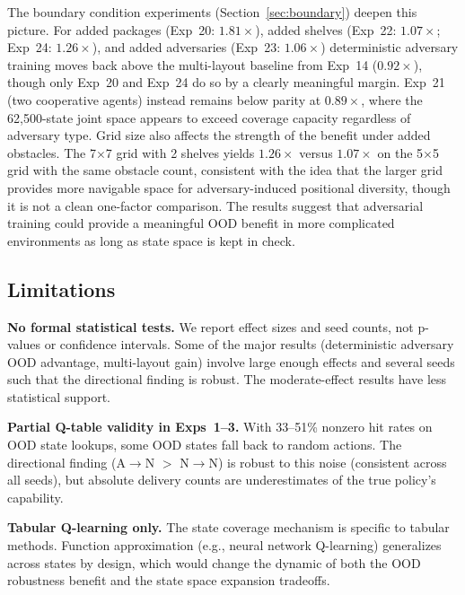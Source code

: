 \documentclass[sigconf]{aamas}
\begin{document}
The boundary condition experiments (Section~\ref{sec:boundary}) deepen this picture.
For added packages (Exp~20: $1.81\times$), added
shelves (Exp~22: $1.07\times$; Exp~24: $1.26\times$), and added adversaries (Exp~23:
$1.06\times$) deterministic adversary training moves back above the multi-layout
baseline from Exp~14 ($0.92\times$), though only Exp~20 and Exp~24 do so by a
clearly meaningful margin. Exp~21 (two cooperative agents) instead remains below
parity at $0.89\times$, where the 62{,}500-state joint space appears to exceed
coverage capacity regardless of adversary type. Grid size also affects the strength of
the benefit under added obstacles. The 7$\times$7 grid with 2 shelves yields
$1.26\times$ versus $1.07\times$ on the 5$\times$5 grid with the same obstacle
count, consistent with the idea that the larger grid provides more navigable
space for adversary-induced positional diversity, though it is not a clean one-factor comparison.
The results suggest that adversarial training could provide a meaningful OOD
benefit in more complicated environments as long as state space is kept in check.

\subsection{Limitations}

\textbf{No formal statistical tests.} We report effect sizes and seed counts,
not p-values or confidence intervals. Some of the major results (deterministic
adversary OOD advantage, multi-layout gain) involve large enough effects and several
seeds such that the directional finding is robust. The moderate-effect results
have less statistical support.

\textbf{Partial Q-table validity in Exps~1--3.} With 33--51\% nonzero hit rates
on OOD state lookups, some OOD states fall back to random actions. The directional
finding (A$\to$N $>$ N$\to$N) is robust to this noise (consistent across all
seeds), but absolute delivery counts are underestimates of the true policy's
capability.

\textbf{Tabular Q-learning only.} The state coverage mechanism is specific to
tabular methods. Function approximation (e.g., neural network Q-learning) generalizes
across states by design, which would change the dynamic of both the OOD robustness
benefit and the state space expansion tradeoffs.
\end{document}
